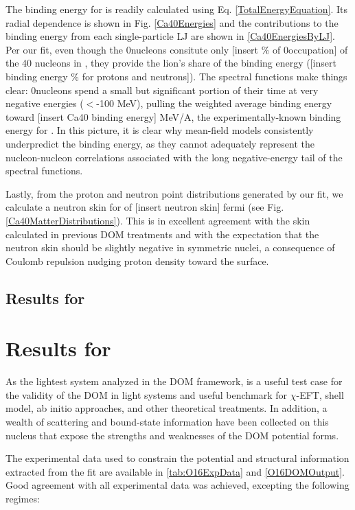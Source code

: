 The binding energy for \caForty is readily calculated using Eq.
\ref{TotalEnergyEquation}. Its radial dependence is shown in Fig. \ref{Ca40Energies} and the
contributions to the binding energy from each single-particle LJ are shown in
\ref{Ca40EnergiesByLJ}. Per our fit, even though the 0\sOne nucleons consitute only [insert \%
of 0\sOne occupation] of the 40 nucleons in \caForty, they provide the lion's share of the binding
energy ([insert binding energy \% for protons and neutrons]). The spectral
functions make things clear: 0\sOne nucleons spend a small but significant portion of their time 
at very negative energies ($<$-100 MeV), pulling the weighted average binding energy toward
[insert Ca40 binding energy] MeV/A, the experimentally-known binding energy for \caForty. In this
picture, it is clear why mean-field models consistently underpredict the binding energy, as they
cannot adequately represent the nucleon-nucleon correlations associated with the long
negative-energy tail of the spectral functions.

Lastly, from the proton and neutron point distributions generated by our fit, we calculate a
\caForty neutron skin for of [insert neutron skin] fermi (see Fig. \ref{Ca40MatterDistributions}). 
This is in excellent agreement with the skin calculated in previous DOM treatments
\cite{MahzoonPhDThesis} and with the expectation that the neutron skin should be slightly negative in
symmetric nuclei, a consequence of Coulomb repulsion nudging proton density toward the surface.

\subsection{Results for \caEight}


\section{Results for \oSixEight}
As the lightest system analyzed in the DOM framework, \oSix is a useful test case
for the validity of the DOM in light systems and useful benchmark for $\chi$-EFT, shell model, ab
initio approaches, and other theoretical treatments. In addition, a wealth of scattering and
bound-state information have been collected on this nucleus that expose the strengths and
weaknesses of the DOM potential forms.

The experimental data used to constrain the \oSix potential and structural information extracted
from the fit are available in \ref{tab:O16ExpData} and \ref{O16DOMOutput}. Good agreement with all 
experimental data was achieved, excepting the following regimes:

